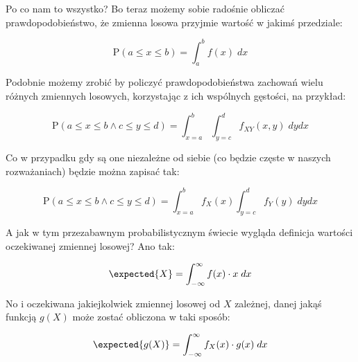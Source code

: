 Po co nam to wszystko? Bo teraz możemy sobie radośnie obliczać prawdopodobieństwo, że zmienna losowa przyjmie wartość w jakimś przedziale:

\[ 
    \mathrm{P}(a \leq x \leq b) = \int_{a}^{b} f(x) \; dx
\]

Podobnie możemy zrobić by policzyć prawdopodobieństwa zachowań wielu różnych zmiennych losowych, korzystając z ich wspólnych gęstości, na przykład:

\[ 
    \mathrm{P}(a \leq x \leq b \land c \leq y \leq d) = \int_{x=a}^{b}\int_{y=c}^{d} f_{XY}(x,y) \; dydx
\]

Co w przypadku gdy są one niezależne od siebie (co będzie częste w naszych rozważaniach) będzie można zapisać tak:

\[ 
    \mathrm{P}(a \leq x \leq b \land c \leq y \leq d) = \int_{x=a}^{b} f_{X}(x)\int_{y=c}^{d} f_{Y}(y) \; dydx
\]

A jak w tym przezabawnym probabilistycznym świecie wygląda definicja wartości oczekiwanej zmiennej losowej? Ano tak:

\[ 
    \expected{X} = \int_{-\infty}^{\infty} f(x) \cdot x \; dx 
\]

No i oczekiwana jakiejkolwiek zmiennej losowej od \(X\) zależnej, danej jakąś funkcją \(g(X)\) może zostać obliczona w taki sposób:

\[ 
    \expected{g(X)} = \int_{-\infty}^{\infty} f_{X}(x) \cdot g(x) \; dx
\]
